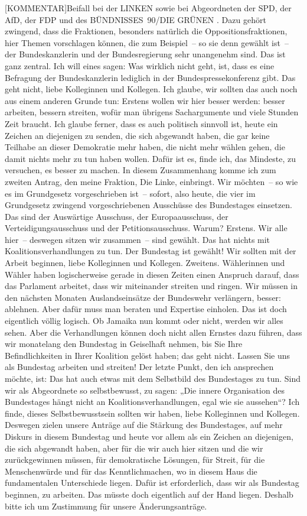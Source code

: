 \documentclass[a4paper,11pt]{article}
\begin{document}
[KOMMENTAR]Beifall bei der LINKEN sowie bei Abgeordneten der SPD, der AfD, der FDP und des BÜNDNISSES 90/DIE GRÜNEN
. Dazu gehört zwingend, dass die Fraktionen, besonders natürlich die Oppositionsfraktionen, hier Themen vorschlagen können, die zum Beispiel – so sie denn gewählt ist – der Bundeskanzlerin und der Bundesregierung sehr unangenehm sind. Das ist ganz zentral. Ich will eines sagen: Was wirklich nicht geht, ist, dass es eine Befragung der Bundeskanzlerin lediglich in der Bundespressekonferenz gibt. Das geht nicht, liebe Kolleginnen und Kollegen. Ich glaube, wir sollten das auch noch aus einem anderen Grunde tun: Erstens wollen wir hier besser werden: besser arbeiten, bessern streiten, wofür man übrigens Sachargumente und viele Stunden Zeit braucht. Ich glaube ferner, dass es auch politisch sinnvoll ist, heute ein Zeichen an diejenigen zu senden, die sich abgewandt haben, die gar keine Teilhabe an dieser Demokratie mehr haben, die nicht mehr wählen gehen, die damit nichts mehr zu tun haben wollen. Dafür ist es, finde ich, das Mindeste, zu versuchen, es besser zu machen. In diesem Zusammenhang komme ich zum zweiten Antrag, den meine Fraktion, Die Linke, einbringt. Wir möchten – so wie es im Grundgesetz vorgeschrieben ist – sofort, also heute, die vier im Grundgesetz zwingend vorgeschriebenen Ausschüsse des Bundestages einsetzen. Das sind der Auswärtige Ausschuss, der Europaausschuss, der Verteidigungsausschuss und der Petitionsausschuss. Warum? Erstens. Wir alle hier – deswegen sitzen wir zusammen – sind gewählt. Das hat nichts mit Koalitionsverhandlungen zu tun. Der Bundestag ist gewählt! Wir sollten mit der Arbeit beginnen, liebe Kolleginnen und Kollegen. Zweitens. Wählerinnen und Wähler haben logischerweise gerade in diesen Zeiten einen Anspruch darauf, dass das Parlament arbeitet, dass wir miteinander streiten und ringen. Wir müssen in den nächsten Monaten Auslandseinsätze der Bundeswehr verlängern, besser: ablehnen. Aber dafür muss man beraten und Expertise einholen. Das ist doch eigentlich völlig logisch. Ob Jamaika nun kommt oder nicht, werden wir alles sehen. Aber die Verhandlungen können doch nicht allen Ernstes dazu führen, dass wir monatelang den Bundestag in Geiselhaft nehmen, bis Sie Ihre Befindlichkeiten in Ihrer Koalition gelöst haben; das geht nicht. Lassen Sie uns als Bundestag arbeiten und streiten! Der letzte Punkt, den ich ansprechen möchte, ist: Das hat auch etwas mit dem Selbstbild des Bundestages zu tun. Sind wir als Abgeordnete so selbstbewusst, zu sagen: „Die innere Organisation des Bundestages hängt nicht an Koalitionsverhandlungen, egal wie sie aussehen“? Ich finde, dieses Selbstbewusstsein sollten wir haben, liebe Kolleginnen und Kollegen. Deswegen zielen unsere Anträge auf die Stärkung des Bundestages, auf mehr Diskurs in diesem Bundestag und heute vor allem als ein Zeichen an diejenigen, die sich abgewandt haben, aber für die wir auch hier sitzen und die wir zurückgewinnen müssen, für demokratische Lösungen, für Streit, für die Menschenwürde und für das Kenntlichmachen, wo in diesem Haus die fundamentalen Unterschiede liegen. Dafür ist erforderlich, dass wir als Bundestag beginnen, zu arbeiten. Das müsste doch eigentlich auf der Hand liegen. Deshalb bitte ich um Zustimmung für unsere Änderungsanträge.
\end{document}
